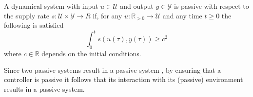 \begin{definition}
  A dynamical system with input $ u \in \mathcal{U}$ and output $y \in \mathcal{Y}$ is passive with respect to the supply rate $s : \mathcal{U} \times \mathcal{Y} \rightarrow{R}$ if, for any $u: \mathbb{R}_{>0} \rightarrow \mathcal{U}$ and any time $t \geq 0$ the following is satisfied
  \begin{equation}
    \int_0^t s \left( u(\tau),  y (\tau) \right) \geq c^2
  \end{equation}
  where $c \in \mathbb{R}$ depends on the initial conditions.
\end{definition}

Since two passive systems result in a passive system \cite{sepulchre2012constructive}, by ensuring that a controller is passive it follows that its interaction with its (passive) environment results in a passive system.
